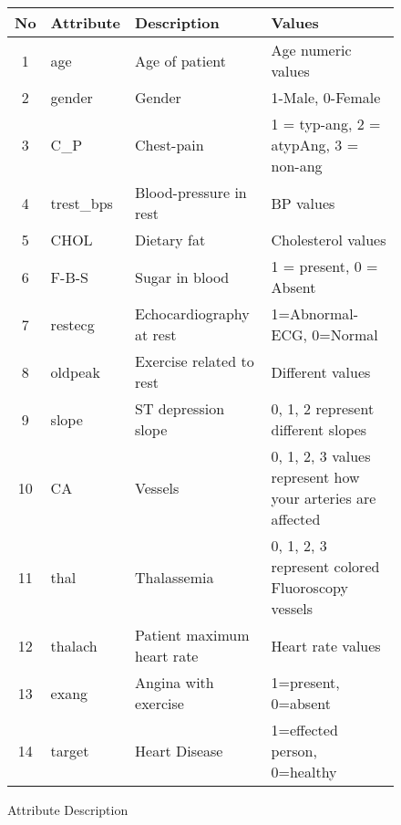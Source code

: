 \documentclass[journal, twoside, final]{IEEEtran}
\begin{document}
\begin{figure*}[!ht]
  \centering
  \caption{Attribute Description}
  \begin{tabular}{|c|l|p{5cm}|l|}
    \hline
    \textbf{No} & \textbf{Attribute} & \textbf{Description} & \textbf{Values} \\
    \hline
    1 & age & Age of patient & Age numeric values \\
    2 & gender & Gender & 1-Male, 0-Female \\
    3 & C\_P & Chest-pain & 1 = typ-ang, 2 = atypAng, 3 = non-ang \\
    4 & trest\_bps & Blood-pressure in rest & BP values \\
    5 & CHOL & Dietary fat & Cholesterol values \\
    6 & F-B-S & Sugar in blood & 1 = present, 0 = Absent \\
    7 & restecg & Echocardiography at rest & 1=Abnormal-ECG, 0=Normal \\
    8 & oldpeak & Exercise related to rest & Different values \\
    9 & slope & ST depression slope & 0, 1, 2 represent different slopes \\
    10 & CA & Vessels & 0, 1, 2, 3 values represent how your arteries are affected \\
    11 & thal & Thalassemia & 0, 1, 2, 3 represent colored Fluoroscopy vessels \\
    12 & thalach & Patient maximum heart rate & Heart rate values \\
    13 & exang & Angina with exercise & 1=present, 0=absent \\
    14 & target & Heart Disease & 1=effected person, 0=healthy \\
    \hline
  \end{tabular}
\end{figure*}
\end{document}
